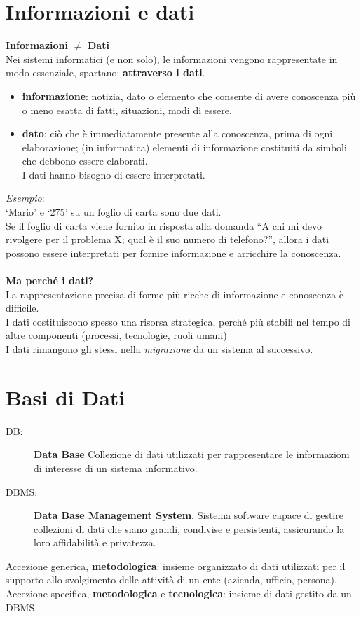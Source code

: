 \section{Informazioni e dati}
\textbf{Informazioni} $\neq$ \textbf{Dati}
\\Nei sistemi informatici (e non solo), le informazioni vengono rappresentate in modo essenziale, spartano: \textbf{attraverso i dati}.
\begin{itemize}
    \item \textbf{informazione}: notizia, dato o elemento che consente di avere conoscenza più o meno esatta di fatti, situazioni, modi di essere.
    \item \textbf{dato}: ciò che è immediatamente presente alla conoscenza, prima di ogni elaborazione; (in informatica) elementi di informazione costituiti da simboli che debbono essere elaborati. 
    \\I dati hanno bisogno di essere interpretati.
\end{itemize}
\textit{Esempio}:
\\‘Mario’ e ‘275’ su un foglio di carta sono due dati. 
\\Se il foglio di carta viene fornito in risposta alla domanda “A chi mi devo rivolgere per il problema X; qual è il suo numero di telefono?”, allora i dati possono essere interpretati per fornire informazione e arricchire la conoscenza.
\\
\\\textbf{Ma perché i dati?}
\\La rappresentazione precisa di forme più ricche di informazione e conoscenza è difficile.
\\I dati costituiscono spesso una risorsa strategica, perché più stabili nel tempo di altre componenti (processi, tecnologie, ruoli umani)
\\I dati rimangono gli stessi nella \textit{migrazione} da un sistema al successivo.

\section{Basi di Dati}
\begin{description}
    \item[DB:] \textbf{Data Base} Collezione di dati utilizzati per rappresentare le informazioni di interesse di un sistema informativo.
    \item[DBMS:] \textbf{Data Base Management System}. Sistema software capace di gestire collezioni di dati che siano grandi, condivise e persistenti, assicurando la loro affidabilità e privatezza.
\end{description}
Accezione generica, \textbf{metodologica}: insieme organizzato di dati utilizzati per il supporto allo svolgimento delle attività di un ente (azienda, ufficio, persona).
\\Accezione specifica, \textbf{metodologica} e \textbf{tecnologica}: insieme di dati gestito da un DBMS.

